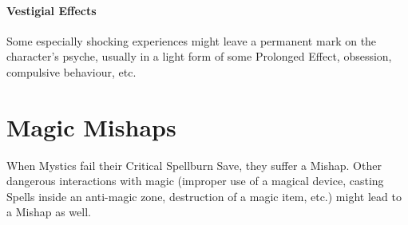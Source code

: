 \documentclass[itdr]{subfiles}
\begin{document}
\paragraph{Vestigial Effects}
Some especially shocking experiences might leave a permanent mark on the character's psyche, usually in a light form of some Prolonged Effect, obsession, compulsive behaviour, etc.


\vfill
\break


\section{Magic Mishaps}
\label{sec:magic_mishaps}

When Mystics fail their Critical Spellburn Save, they suffer a Mishap. Other dangerous \mbox{interactions} with magic (improper use of a magical device, casting Spells inside an anti-magic zone, destruction of a magic item, etc.) might lead to a Mishap as well.
\end{document}
